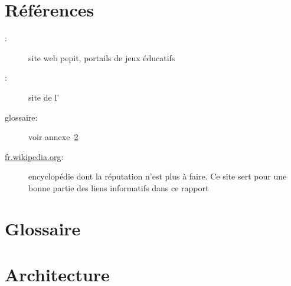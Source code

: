 \chapter{Références}
\begin{description}
	\item[\pepitSite{}:] site web pepit, portails de jeux éducatifs
	\item[\siteulco{}:] site de l'\ulco
	\item[glossaire:] voir annexe~\ref{annexe_glossaire}
	\item[\href{http://fr.wikipedia.org/}{fr.wikipedia.org}:] encyclopédie dont la réputation n'est plus à faire. Ce site sert pour une bonne partie des \og{}liens informatifs\fg{} dans ce rapport
\end{description}


\chapter{Glossaire}
\label{annexe_glossaire}



%
%
%


\chapter{Architecture}
\label{annexe_architecture}



